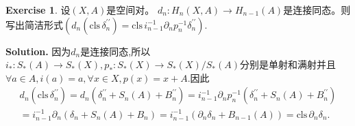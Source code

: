 \documentclass[a4paper]{book}
\newenvironment{solution}%
{\noindent\textbf{Solution.}}%
{\qedhere}
\numberwithin{equation}{chapter}
\theoremstyle{definition}
\newtheorem{exc}[exm]{Exercise}
\begin{document}
\begin{exc}
	设$ (X,A) $是空间对。 $ d_n \colon H_n(X,A) \rightarrow H_{n-1}(A) $是连接同态。则写出简洁形式$ (d_n(\text{cls}\, \delta^{\prime \prime}_n) = \text{cls}\, i^{-1}_{n-1} \partial_n p^{-1}_n \delta^{\prime \prime}_n) $.
\end{exc}

\begin{solution}
	因为$ d_n $是连接同态,所以$ i_*\colon S_*(A) \rightarrow S_*(X) ,p_*\colon S_*(X) \rightarrow S_*(X)/S_*(A) $分别是单射和满射并且$ \forall a \in A, i(a) = a, \forall x \in X, p(x) = x + A $.因此
	\begin{align*}
	d_n(\text{cls}\, \delta^{\prime \prime}_n) = d_n(\delta^{\prime \prime}_n + S_n(A) + B^{\prime \prime}_{n}) = i_{n-1}^{-1} \partial_n p^{-1}_n (\delta^{\prime \prime}_n + S_n(A) + B_{n}^{\prime \prime}) \\
	= i_{n-1}^{-1} \partial_n (\delta_n + S_n(A) + B_n) = i_{n-1}^{-1}(\partial_n\delta_{n} + B_{n-1}(A)) = \text{cls}\, \partial_n \delta_n .
	\end{align*}
\end{solution}

%

%

%


\end{document}

